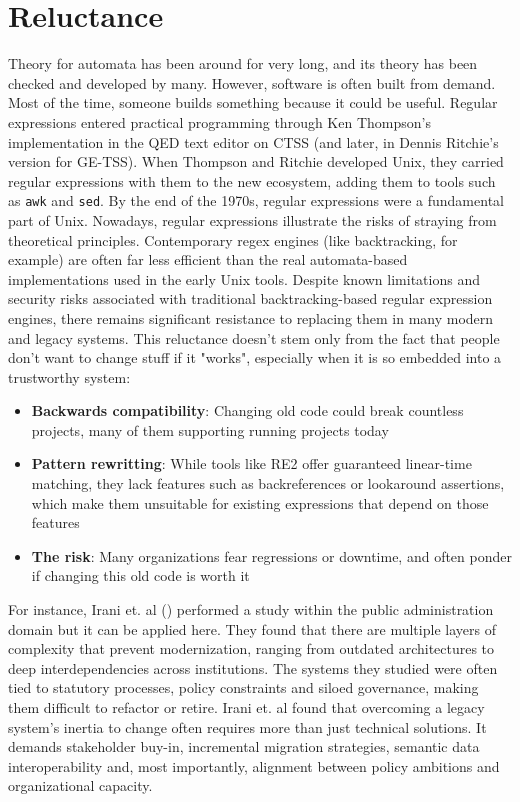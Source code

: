 \section{Reluctance}
Theory for automata has been around for very long, and its theory has been checked and developed by many. However, software is often built from demand. Most of the time, someone builds something because it could be useful. Regular expressions entered practical programming through Ken Thompson's implementation in the QED text editor on CTSS (and later, in Dennis Ritchie's version for GE-TSS). When Thompson and Ritchie developed Unix, they carried regular expressions with them to the new ecosystem, adding them to tools such as \texttt{awk} and \texttt{sed}.
By the end of the 1970s, regular expressions were a fundamental part of Unix. Nowadays, regular expressions illustrate the risks of straying from theoretical principles. Contemporary regex engines (like backtracking, for example) are often far less efficient than the real automata-based implementations used in the early Unix tools.
Despite known limitations and security risks associated with traditional backtracking-based regular expression engines, there remains significant resistance to replacing them in many modern and legacy systems. This reluctance doesn't stem only from the fact that people don't want to change stuff if it "works", especially when it is so embedded into a trustworthy system:
\begin{itemize}
	\item \textbf{Backwards compatibility}: Changing old code could break countless projects, many of them supporting running projects today
	\item \textbf{Pattern rewritting}: While tools like RE2 offer guaranteed linear-time matching, they lack features such as backreferences or lookaround assertions, which make them unsuitable for existing expressions that depend on those features
	\item \textbf{The risk}: Many organizations fear regressions or downtime, and often ponder if changing this old code is worth it
\end{itemize}

For instance, Irani et. al (\cite{reluctance_study}) performed a study within the public administration domain but it can be applied here. They found that there are multiple layers of complexity that prevent modernization, ranging from outdated architectures to deep interdependencies across institutions. The systems they studied were often tied to statutory processes, policy constraints and siloed governance, making them difficult to refactor or retire.
Irani et. al found that overcoming a legacy system's inertia to change often requires more than just technical solutions. It demands stakeholder buy-in, incremental migration strategies, semantic data interoperability and, most importantly, alignment between policy ambitions and organizational capacity.











